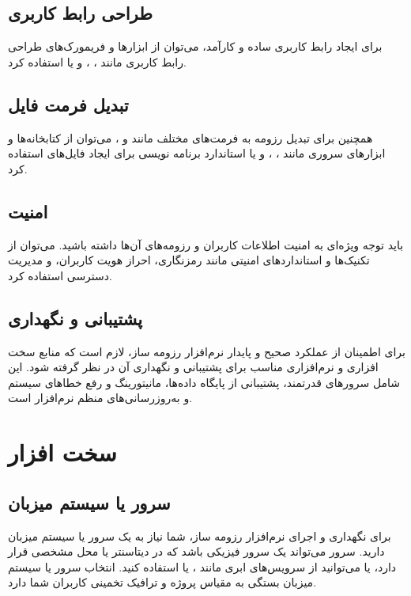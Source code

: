 \documentclass[]{article}
\begin{document}
	
	\subsection{\LARGE{طراحی رابط کاربری}}
	برای ایجاد رابط کاربری ساده و کارآمد، می‌توان از ابزارها و فریمورک‌های طراحی رابط کاربری مانند 
	، ،  و یا  استفاده کرد.
	
	
	\subsection{\LARGE{تبدیل فرمت فایل}}
	
	
	همچنین برای  تبدیل رزومه به فرمت‌های مختلف مانند  و ، می‌توان از کتابخانه‌ها و ابزارهای سروری مانند 
	، ، و یا استاندارد برنامه‌ نویسی
	 برای ایجاد فایل‌های  استفاده کرد.
	
	\subsection{\LARGE{امنیت}}
	باید توجه ویژه‌ای به امنیت اطلاعات کاربران و رزومه‌های آن‌ها داشته باشید. می‌توان از تکنیک‌ها و استانداردهای امنیتی مانند رمزنگاری، احراز هویت کاربران، و مدیریت دسترسی استفاده کرد.
	
	\subsection{\LARGE{پشتیبانی و نگهداری}}
	برای اطمینان از عملکرد صحیح و پایدار نرم‌افزار رزومه ساز، لازم است که منابع سخت افزاری و نرم‌افزاری مناسب برای پشتیبانی و نگهداری آن در نظر گرفته شود. این شامل سرورهای قدرتمند، پشتیبانی از پایگاه داده‌ها، مانیتورینگ و رفع خطاهای سیستم و به‌روزرسانی‌های منظم نرم‌افزار است.
	
	
	\section{\huge{سخت افزار}}
	
	\subsection{\LARGE{سرور یا سیستم میزبان}}
	
	برای نگهداری و اجرای نرم‌افزار رزومه ساز، شما نیاز به یک سرور یا سیستم میزبان دارید. سرور می‌تواند یک سرور فیزیکی باشد که در دیتاسنتر یا محل مشخصی قرار دارد، یا می‌توانید از سرویس‌های ابری مانند 
	،   یا 
	 استفاده کنید. انتخاب سرور یا سیستم میزبان بستگی به مقیاس پروژه و ترافیک تخمینی کاربران شما دارد.
	
\end{document}
